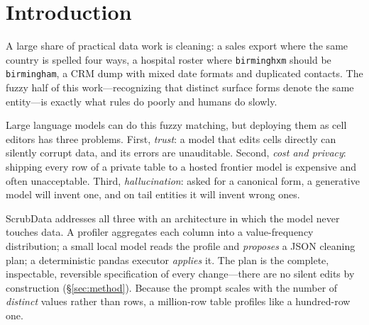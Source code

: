 \documentclass[11pt]{article}
\begin{document}
\section{Introduction}

A large share of practical data work is cleaning: a sales export where the same country
is spelled four ways, a hospital roster where \texttt{birminghxm} should be
\texttt{birmingham}, a CRM dump with mixed date formats and duplicated contacts. The
fuzzy half of this work---recognizing that distinct surface forms denote the same
entity---is exactly what rules do poorly and humans do slowly.

Large language models can do this fuzzy matching, but deploying them as cell editors has
three problems. First, \emph{trust}: a model that edits cells directly can silently
corrupt data, and its errors are unauditable. Second, \emph{cost and privacy}: shipping
every row of a private table to a hosted frontier model is expensive and often
unacceptable. Third, \emph{hallucination}: asked for a canonical form, a generative model
will invent one, and on tail entities it will invent wrong ones.

ScrubData addresses all three with an architecture in which the model never touches
data. A profiler aggregates each column into a value-frequency distribution; a small
local model reads the profile and \emph{proposes} a JSON cleaning plan; a deterministic
pandas executor \emph{applies} it. The plan is the complete, inspectable, reversible
specification of every change---there are no silent edits by construction
(\S\ref{sec:method}). Because the prompt scales with the number of \emph{distinct}
values rather than rows, a million-row table profiles like a hundred-row one.
\end{document}
